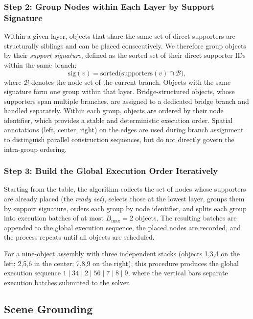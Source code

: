 \documentclass[journal]{IEEEtran}
\begin{document}
\subsubsection{Step 2: Group Nodes within Each Layer by Support Signature}

Within a given layer, objects that share the same set of direct supporters are
structurally siblings and can be placed consecutively. We therefore group objects by
their \emph{support signature}, defined as the sorted set of their direct supporter IDs
within the same branch:
\begin{equation}
  \mathrm{sig}(v) = \mathrm{sorted}\bigl(\mathrm{supporters}(v) \cap \mathcal{B}\bigr),
  \label{eq:signature}
\end{equation}
where $\mathcal{B}$ denotes the node set of the current branch.
Objects with the same signature form one group within that layer.
Bridge-structured objects, whose supporters span multiple branches, are assigned to
a dedicated bridge branch and handled separately.
Within each group, objects are ordered by their node identifier, which provides a
stable and deterministic execution order. Spatial annotations (left, center, right)
on the edges are used during branch assignment to distinguish parallel construction
sequences, but do not directly govern the intra-group ordering.

\subsubsection{Step 3: Build the Global Execution Order Iteratively}

Starting from the table, the algorithm collects the set of nodes whose supporters are
already placed (the \emph{ready set}), selects those at the lowest layer, groups them
by support signature, orders each group by node identifier, and splits each group into
execution batches of at most $B_{\max} = 2$ objects. The resulting batches are
appended to the global execution sequence, the placed nodes are recorded, and the
process repeats until all objects are scheduled.

For a nine-object assembly with three independent stacks (objects 1,3,4 on the left;
2,5,6 in the center; 7,8,9 on the right), this procedure produces the global
execution sequence $1 \mid 34 \mid 2 \mid 56 \mid 7 \mid 8 \mid 9$,
where the vertical bars separate execution batches submitted to the solver.

\subsection{Scene Grounding}
\label{subsec:scene_grounding}
\end{document}
